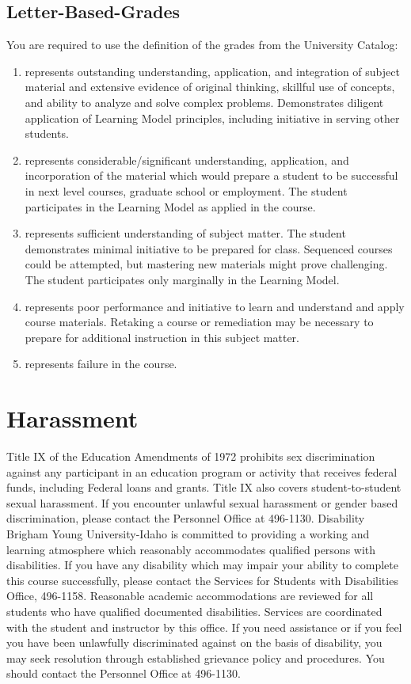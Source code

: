 \documentclass[12pt]{amsart}
\begin{document}
\subsection{Letter-Based-Grades}You are required to use the definition of the grades from the University Catalog:
\begin{enumerate}[label=\textbf{\Alph*}]
	\item represents outstanding understanding, application, and integration of subject material and extensive evidence of original thinking, skillful use of concepts, and ability to analyze and solve complex problems. Demonstrates diligent application of Learning Model principles, including initiative in serving other students.
	\item represents considerable/significant understanding, application, and incorporation of the material which would prepare a student to be successful in next level courses, graduate school or employment. The student participates in the Learning Model as applied in the course. 
	\item represents sufficient understanding of subject matter. The student demonstrates minimal initiative to be prepared for class. Sequenced courses could be attempted, but mastering new materials might prove challenging. The student participates only marginally in the Learning Model.
	\item represents poor performance and initiative to learn and understand and apply course materials. Retaking a course or remediation may be necessary to prepare for additional instruction in this subject matter. 
	\item represents failure in the course.
\end{enumerate}

\section{Harassment}
	Title IX of the Education Amendments of 1972 prohibits sex discrimination against any participant in an education program or activity that receives federal funds, including Federal loans and grants. Title IX also covers student-to-student sexual harassment. If you encounter unlawful sexual harassment or gender based discrimination, please contact the Personnel Office at 496-1130.
Disability
	Brigham Young University-Idaho is committed to providing a working and learning atmosphere which reasonably accommodates qualified persons with disabilities. If you have any disability which may impair your ability to complete this course successfully, please contact the Services for Students with Disabilities Office, 496-1158. Reasonable academic accommodations are reviewed for all students who have qualified documented disabilities. Services are coordinated with the student and instructor by this office. If you need assistance or if you feel you have been unlawfully discriminated against on the basis of disability, you may seek resolution through established grievance policy and procedures. You should contact the Personnel Office at 496-1130.
\end{document}
